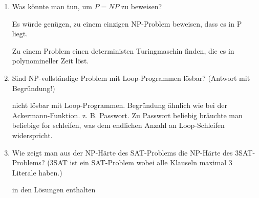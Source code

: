 \documentclass{lehramt-informatik-aufgabe}
\begin{document}
\begin{enumerate}

\item Was könnte man tun, um $P = NP$ zu beweisen?

\begin{liAntwort}
Es würde genügen, zu einem einzigen NP-Problem beweisen, dass es in P
liegt.

Zu einem Problem einen deterministen Turingmaschin finden, die es
in polynomineller Zeit löst.
\end{liAntwort}



\item Sind NP-vollständige Problem mit Loop-Programmen lösbar? (Antwort
mit Begründung!)

\begin{liAntwort}
nicht lösbar mit Loop-Programmen. Begründung ähnlich wie bei der
Ackermann-Funktion. z. B. Passwort. Zu Passwort beliebig bräuchte man
beliebige for schleifen, was dem endlichen Anzahl an Loop-Schleifen
widerspricht.
\end{liAntwort}



\item Wie zeigt man aus der NP-Härte des SAT-Problems die NP-Härte des
3SAT-Problems? (3SAT ist ein SAT-Problem wobei alle Klauseln maximal 3
Literale haben.)

\begin{liAntwort}
in den Lösungen enthalten
\end{liAntwort}

\end{enumerate}
\end{document}
